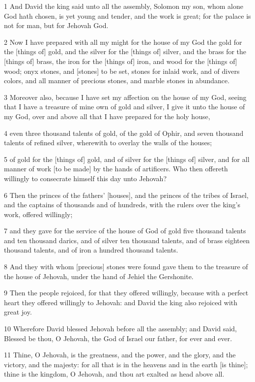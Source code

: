 \par 1 And David the king said unto all the assembly, Solomon my son, whom alone God hath chosen, is yet young and tender, and the work is great; for the palace is not for man, but for Jehovah God.
\par 2 Now I have prepared with all my might for the house of my God the gold for the [things of] gold, and the silver for the [things of] silver, and the brass for the [things of] brass, the iron for the [things of] iron, and wood for the [things of] wood; onyx stones, and [stones] to be set, stones for inlaid work, and of divers colors, and all manner of precious stones, and marble stones in abundance.
\par 3 Moreover also, because I have set my affection on the house of my God, seeing that I have a treasure of mine own of gold and silver, I give it unto the house of my God, over and above all that I have prepared for the holy house,
\par 4 even three thousand talents of gold, of the gold of Ophir, and seven thousand talents of refined silver, wherewith to overlay the walls of the houses;
\par 5 of gold for the [things of] gold, and of silver for the [things of] silver, and for all manner of work [to be made] by the hands of artificers. Who then offereth willingly to consecrate himself this day unto Jehovah?
\par 6 Then the princes of the fathers' [houses], and the princes of the tribes of Israel, and the captains of thousands and of hundreds, with the rulers over the king's work, offered willingly;
\par 7 and they gave for the service of the house of God of gold five thousand talents and ten thousand darics, and of silver ten thousand talents, and of brass eighteen thousand talents, and of iron a hundred thousand talents.
\par 8 And they with whom [precious] stones were found gave them to the treasure of the house of Jehovah, under the hand of Jehiel the Gershonite.
\par 9 Then the people rejoiced, for that they offered willingly, because with a perfect heart they offered willingly to Jehovah: and David the king also rejoiced with great joy.
\par 10 Wherefore David blessed Jehovah before all the assembly; and David said, Blessed be thou, O Jehovah, the God of Israel our father, for ever and ever.
\par 11 Thine, O Jehovah, is the greatness, and the power, and the glory, and the victory, and the majesty: for all that is in the heavens and in the earth [is thine]; thine is the kingdom, O Jehovah, and thou art exalted as head above all.
